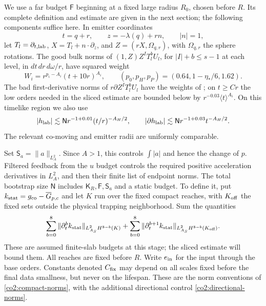 We use a far budget $\mathsf F$ beginning at a fixed large radius $R_0$, chosen
before $R$.  Its complete definition and estimate are given in the next
section; the following components suffice here.  In emitter coordinates
\[
 t=q+r,\qquad z=-\lambda(q)+rn,\qquad |n|=1,
\]
let $T_l=\partial_{t,\rm lab}$, $X=T_l+n\cdot\partial_z$, and
$Z=(rX,\Omega_{q,r})$, with $\Omega_{q,r}$ the sphere rotations.  The good
bulk norms of $(1,Z)Z^I T_l^bU_l$, for $|I|+b\le s-1$ at each
level, in $dt\,dr\,d\omega/r$, have squared weight
\begin{equation}\label{co2:far-weights}
 W_i=r^{p_i-A_i}(t+10r)^{A_i},
 \qquad (p_0,p_H,p_P)=(0.64,1-\eta_*/6,1.62).
\end{equation}
The bad first-derivative norms of $r\partial Z^I T_l^bU_l$ have the weights
of ; on $t\ge Cr$ the low orders needed in the sliced estimate
are bounded below by $r^{-0.03}\langle t\rangle^{A_i}$.  On this timelike
region we also use
\begin{equation}\label{co2:far-pointwise}
 |h_{\rm lab}|\lesssim\mathsf N r^{-1+0.01}(t/r)^{-A_H/2},
 \qquad
 |\partial h_{\rm lab}|\lesssim\mathsf N r^{-1+0.03}t^{-A_H/2}.
\end{equation}
The relevant co-moving and emitter radii are uniformly comparable.

Set $\mathsf S_a=\|a\|_{L^2_A}$.  Since $A>1$, this controls
$\int|a|$ and hence the change of $p$.  Filtered feedback from the $u$ budget
controls the required positive acceleration derivatives in $L^2_A$, and then
their finite list of endpoint norms.  The total bootstrap size $\mathsf N$
includes $\mathsf K_R,\mathsf F,\mathsf S_a$ and a static budget.
To define it, put $k_{\rm stat}=g_{\rm co}-\overline G_{p,c}$ and let
$K$ run over the fixed compact reaches, with $K_{\rm off}$ the fixed
sets outside the physical trapping neighborhood. Sum the quantities
\[
 \sum_{b=0}^{8}\|\partial_t^bk_{\rm stat}\|_{L^2_{A_S}H^{8-b}(K)}
 +\sum_{b=0}^{8}\|\partial_t^{b+1}k_{\rm stat}
                           \|_{L^2_{A_S}H^{8-b}(K_{\rm off})}.
\]
These are assumed finite-slab budgets at this stage; the sliced estimate
will bound them. All reaches are fixed before $R$. Write $e_{\rm in}$ for the input through the base orders.
Constants denoted $C_{\rm fix}$ may depend on all scales fixed before the
final data smallness, but never on the lifespan.  These are the norm conventions
of \eqref{co2:compact-norms}, with the additional directional control
\eqref{co2:directional-norms}.

